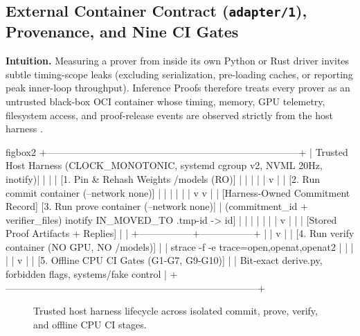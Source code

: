 \documentclass[11pt,letterpaper]{article}
\begin{document}
\subsection{External Container Contract (\texttt{adapter/\allowbreak{}1}), Provenance, and Nine CI Gates}

\textbf{Intuition.} Measuring a prover from inside its own Python or Rust driver invites subtle timing-scope leaks (excluding serialization, pre-loading caches, or reporting peak inner-loop throughput). Inference Proofs therefore treats every prover as an untrusted black-box OCI container whose timing, memory, GPU telemetry, filesystem access, and proof-release events are observed strictly from the host harness \cite{iproofs2026}.

\begin{SaveVerbatim}[fontsize=\scriptsize]{figbox2}
+------------------------------------------------------------------------------+
| Trusted Host Harness (CLOCK_MONOTONIC, systemd cgroup v2, NVML 20Hz, inotify)|
|                                                                              |
|  [1. Pin & Rehash Weights /models (RO)]                                      |
|                     |                                                        |
|                     v                                                        |
|  [2. Run commit container (--network none)]                                  |
|         |                                   |                                |
|         v                                   v                                |
|  [Harness-Owned Commitment Record]   [3. Run prove container (--network none)|
|   (commitment_id + verifier_files)       inotify IN_MOVED_TO .tmp-id -> id]  |
|         |                                   |                                |
|         |                                   v                                |
|         |                            [Stored Proof Artifacts + Replies]      |
|         +-----------------+-----------------+                                |
|                           v                                                  |
|  [4. Run verify container (NO GPU, NO /models)]                              |
|      strace -f -e trace=open,openat,openat2                                  |
|                           |                                                  |
|                           v                                                  |
|  [5. Offline CPU CI Gates (G1-G7, G9-G10)]                                   |
|      Bit-exact derive.py, forbidden flags, systems/fake control              |
+------------------------------------------------------------------------------+
\end{SaveVerbatim}
\begin{figure}[htbp]
\centering
\setlength{\fboxsep}{6pt}
\caption{Trusted host harness lifecycle across isolated commit, prove, verify, and offline CPU CI stages.}
\label{fig:harness-lifecycle}
\end{figure}
\end{document}
